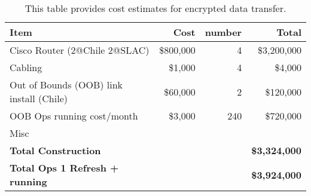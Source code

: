 \tiny \begin{longtable} {|l|r|r|r|} \caption{This table provides cost estimates for encrypted data transfer. \label{tab:ipsec}}\\ 
\hline 
\textbf{Item}&\textbf{Cost}&\textbf{number}&\textbf{Total} \\ \hline
{Cisco Router (2@Chile 2@SLAC)}&{\$800,000}&{4}&{\$3,200,000} \\ \hline
{Cabling}&{\$1,000}&{4}&{\$4,000} \\ \hline
{Out of Bounds (OOB) link  install (Chile)}&{\$60,000}&{2}&{\$120,000} \\ \hline
{OOB Ops running cost/month}&{\$3,000}&{240}&{\$720,000} \\ \hline
{Misc}&&& \\ \hline
\textbf{Total Construction}&\textbf{}&\textbf{}&\textbf{\$3,324,000} \\ \hline
\textbf{Total Ops 1 Refresh  + running }&\textbf{}&\textbf{}&\textbf{\$3,924,000} \\ \hline
\end{longtable} \normalsize
